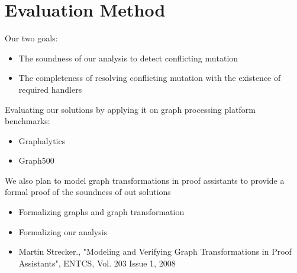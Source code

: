 \section{Evaluation Method}
\begin{frame}
Our two goals:
  	\begin{itemize}
		 \item The soundness of our analysis to detect conflicting mutation
		 \item The completeness of resolving conflicting mutation with the
		 existence of required handlers
    \end{itemize}
    Evaluating our solutions by applying it on graph processing platform
    benchmarks:
    \begin{itemize}
		 \item Graphalytics
		 \item Graph500
    \end{itemize}
\end{frame}

\begin{frame}
 We also plan to model graph transformations in proof assistants to
 provide a formal proof of the soundness of out solutions \linebreak
\begin{itemize}
  \item Formalizing graphs and graph transformation
  \item Formalizing our analysis 
  \item Martin Strecker., "Modeling and Verifying Graph Transformations in
  Proof Assistants", ENTCS, Vol. 203 Issue 1, 2008
\end{itemize}

\end{frame}

 